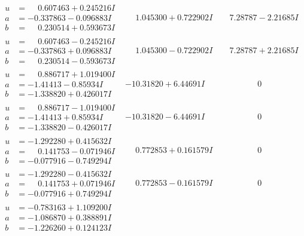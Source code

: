 \documentclass[1p]{elsarticle_modified}
\theoremstyle{definition}
\begin{document}
$$\begin{array}{c|c|c}
\begin{aligned}
u &= \phantom{-}0.607463 + 0.245216 I \\
a &= -0.337863 - 0.096883 I \\
b &= \phantom{-}0.230514 + 0.593673 I\end{aligned}
 & \phantom{-}1.045300 + 0.722902 I & \phantom{-}7.28787 - 2.21685 I \\ \hline\begin{aligned}
u &= \phantom{-}0.607463 - 0.245216 I \\
a &= -0.337863 + 0.096883 I \\
b &= \phantom{-}0.230514 - 0.593673 I\end{aligned}
 & \phantom{-}1.045300 - 0.722902 I & \phantom{-}7.28787 + 2.21685 I \\ \hline\begin{aligned}
u &= \phantom{-}0.886717 + 1.019400 I \\
a &= -1.41413 - 0.85934 I \\
b &= -1.338820 + 0.426017 I\end{aligned}
 & -10.31820 + 6.44691 I & \phantom{-0.000000 } 0 \\ \hline\begin{aligned}
u &= \phantom{-}0.886717 - 1.019400 I \\
a &= -1.41413 + 0.85934 I \\
b &= -1.338820 - 0.426017 I\end{aligned}
 & -10.31820 - 6.44691 I & \phantom{-0.000000 } 0 \\ \hline\begin{aligned}
u &= -1.292280 + 0.415632 I \\
a &= \phantom{-}0.141753 - 0.071946 I \\
b &= -0.077916 - 0.749294 I\end{aligned}
 & \phantom{-}0.772853 + 0.161579 I & \phantom{-0.000000 } 0 \\ \hline\begin{aligned}
u &= -1.292280 - 0.415632 I \\
a &= \phantom{-}0.141753 + 0.071946 I \\
b &= -0.077916 + 0.749294 I\end{aligned}
 & \phantom{-}0.772853 - 0.161579 I & \phantom{-0.000000 } 0 \\ \hline\begin{aligned}
u &= -0.783163 + 1.109200 I \\
a &= -1.086870 + 0.388891 I \\
b &= -1.226260 + 0.124123 I\end{aligned}

\end{array}$$
\end{document}

